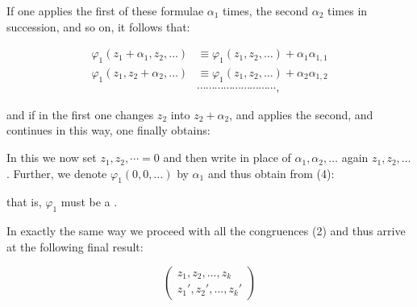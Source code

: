 If one applies the first of these formulae $\alpha_1$ times, the second $\alpha_2$ times
in succession, and so on, it follows that:

\[
\begin{aligned}
\varphi_1(z_1+\alpha_1, z_2, \dots) &\equiv \varphi_1(z_1, z_2, \dots) + \alpha_1\alpha_{1,1} \\
\varphi_1(z_1, z_2+\alpha_2, \dots) &\equiv \varphi_1(z_1, z_2, \dots) + \alpha_2\alpha_{1,2} \\
&\cdots\cdots\cdots\cdots\cdots\cdots\cdots\cdots\cdots,
\end{aligned}
\]

and if in the first one changes $z_2$ into $z_2+\alpha_2$, and applies the
second, and continues in this way, one finally obtains:


In this we now set $z_1, z_2, \cdots = 0$ and then write in place of
$\alpha_1, \alpha_2, \dots$ again $z_1, z_2, \dots$. Further, we denote
$\varphi_1(0, 0, \dots)$ by $\alpha_1$ and thus obtain from (4):


that is, $\varphi_1$ must be a .

In exactly the same way we proceed with all the congruences (2) and thus arrive at the following final result:


\[
\begin{pmatrix} z_1, z_2, \dots, z_k \\ z_1', z_2', \dots, z_k' \end{pmatrix}
\]



